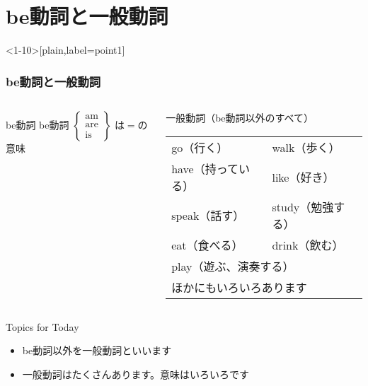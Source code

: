 \documentclass[aspectratio=169,xcolor={dvipsnames,table}]{beamer}
\begin{document}
\section{be動詞と一般動詞}
\begin{frame}<1-10>[plain,label=point1]\frametitle{be動詞と一般動詞}

\begin{columns}
\begin{column}[t]{.38\textwidth}
\begin{block}{be動詞}
be動詞
{\footnotesize
$
 \left\{
\begin{array}{l}
\text{am}\\
\text{are}\\
\text{is}
\end{array}\right\}
$
}
は$=$の意味
\end{block}
\end{column}
\pause
\begin{column}[t]{.52\textwidth}
\begin{alertblock}{一般動詞（be動詞以外のすべて）}
\begin{tabular}[t]{ll}
go（行く）&walk（歩く）\pause\\
have（持っている）&like（好き）\pause\\
speak（話す）&study（勉強する）\pause\\
eat（食べる）& drink（飲む）\pause\\
\multicolumn{2}{l}{play（遊ぶ、演奏する）\pause}\\
\multicolumn{2}{l}{ほかにもいろいろあります}\\
\end{tabular}
\end{alertblock}
\end{column}
\end{columns}


\bigskip
\pause
\begin{exampleblock}{Topics for Today}
\begin{itemize}[<+- |alert@+>]
 \item  be動詞以外を一般動詞といいます
 \item 一般動詞はたくさんあります。意味はいろいろです
\end{itemize}
     \end{exampleblock}

\end{frame}
\end{document}
